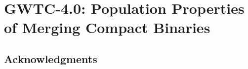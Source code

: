 \chapter{GWTC-4.0: Population Properties of Merging Compact Binaries}
\label{chapter: gwtc4}

\chapteraffiliations{}

\begin{refsection}

\begin{chapterabstract}

\end{chapterabstract}










\section*{Acknowledgments}


\begin{subappendices}

\end{subappendices}

\printbibliography[heading=subbibliography]
\end{refsection}

%
